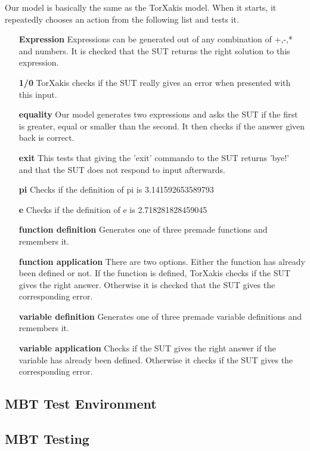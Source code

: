 \documentclass[11pt,a4paper]{article}
\begin{document}
Our model is basically the same as the TorXakis model. When it starts, it repeatedly chooses an action from the following list and tests it.
\begin{itemize}
	\item[\textbf{Expression}] Expressions can be generated out of any combination of +,-,* and numbers. It is checked that the SUT returns the right solution to this expression.
	\item[\textbf{1/0}] TorXakis checks if the SUT really gives an error when presented with this input.
	\item[\textbf{equality}] Our model generates two expressions and asks the SUT if the first is greater, equal or smaller than the second. It then checks if the answer given back is correct.
	\item[\textbf{exit}] This tests that giving the 'exit' commando to the SUT returns 'bye!' and that the SUT does not respond to input afterwards.
	\item[\textbf{pi}] Checks if the definition of pi is 3.141592653589793
	\item[\textbf{e}] Checks if the definition of e is 2.718281828459045
	\item[\textbf{function definition}] Generates one of three premade functions and remembers it.
	\item[\textbf{function application}] There are two options. Either the function has already been defined or not. If the function is defined, TorXakis checks if the SUT gives the right answer. Otherwise it is checked that the SUT gives the corresponding error.
	\item[\textbf{variable definition}] Generates one of three premade variable definitions and remembers it.
	\item[\textbf{variable application}] Checks if the SUT gives the right answer if the variable has already been defined. Otherwise it checks if the SUT gives the corresponding error.
\end{itemize}

\subsection{MBT Test Environment}



\subsection{MBT Testing}
\end{document}
